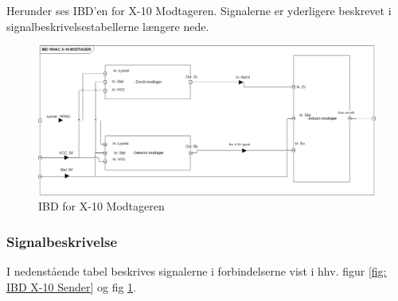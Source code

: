 \documentclass[11pt]{article}
\begin{document}
Herunder ses IBD'en for X-10 Modtageren. Signalerne er yderligere beskrevet i signalbeskrivelsestabellerne længere nede. 

\begin{figure}[!ht]
	\centering
	\includegraphics[width=\textwidth]{IBD_modtager.png}
	\caption{IBD for X-10 Modtageren}
	\label{fig: IBD X-10 Modtager}
\end{figure}

\subsubsection*{Signalbeskrivelse}
I nedenstående tabel beskrives signalerne i forbindelserne vist i hhv. figur \ref{fig: IBD X-10 Sender} og fig \ref{fig: IBD X-10 Modtager}.
\end{document}
